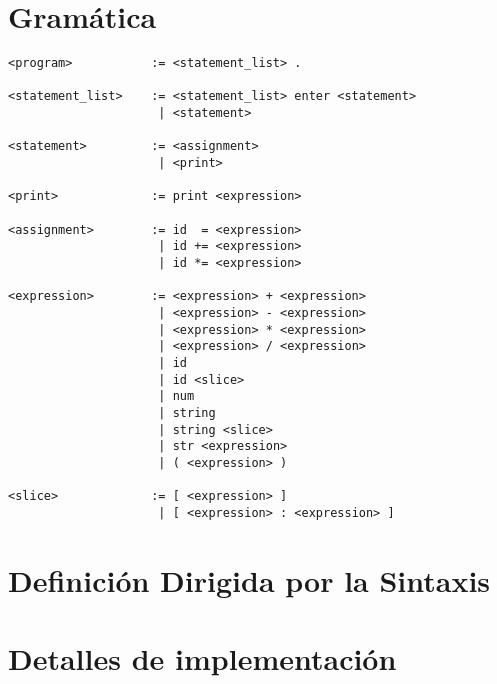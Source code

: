 \documentclass [a4paper,titlepage]{report}
\begin{document}
\chapter{Gramática}

\begin{verbatim}
<program>           := <statement_list> .

<statement_list>    := <statement_list> enter <statement>
                     | <statement>

<statement>         := <assignment>
                     | <print>

<print>             := print <expression>

<assignment>        := id  = <expression>
                     | id += <expression>
                     | id *= <expression>

<expression>        := <expression> + <expression>
                     | <expression> - <expression>
                     | <expression> * <expression>
                     | <expression> / <expression>
                     | id
                     | id <slice>
                     | num
                     | string
                     | string <slice>
                     | str <expression>
                     | ( <expression> )

<slice>             := [ <expression> ]
                     | [ <expression> : <expression> ]
\end{verbatim}

\chapter{Definición Dirigida por la Sintaxis}

\chapter{Detalles de implementación}
\end{document}
